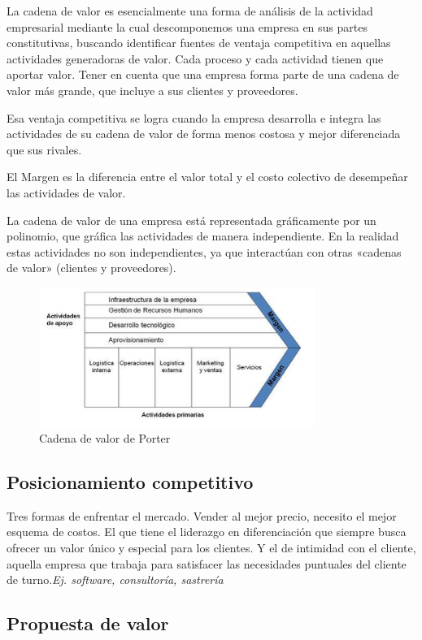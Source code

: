 \documentclass[titlepage,a4paper]{article}
\begin{document}
La cadena de valor es esencialmente una forma de análisis de la actividad empresarial mediante la cual descomponemos una empresa en sus partes constitutivas, buscando identificar fuentes de ventaja competitiva en aquellas actividades generadoras de valor. Cada proceso y cada actividad tienen que aportar valor. Tener en cuenta que una empresa forma parte de una cadena de valor más grande, que incluye a sus clientes y proveedores. 
 
Esa ventaja competitiva se logra cuando la empresa desarrolla e integra las actividades de su cadena de valor de forma menos costosa y mejor diferenciada que sus rivales. 

El Margen es la diferencia entre el valor total y el costo colectivo de desempeñar las actividades de valor.

La cadena de valor de una empresa está representada gráficamente por un polinomio, que gráfica las actividades de manera independiente. En la realidad estas actividades no son independientes, ya que interactúan con otras «cadenas de valor» (clientes y proveedores). 

\begin{figure}[!htb]
    \centering
    \includegraphics[width=0.8\textwidth]{imagenes/CadenaDeValor.PNG}
    \caption{Cadena de valor de Porter}
\end{figure}


\subsection{Posicionamiento competitivo}
Tres formas de enfrentar el mercado. Vender al mejor precio, necesito el mejor esquema de costos. El que tiene el liderazgo en diferenciación que siempre busca ofrecer un valor único y especial para los clientes. Y el de intimidad con el cliente, aquella empresa que trabaja para satisfacer las necesidades puntuales del cliente de turno.\textit{Ej. software, consultoría, sastrería}


\subsection{Propuesta de valor}
\end{document}
